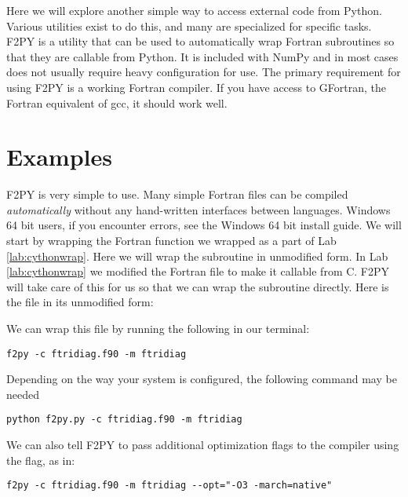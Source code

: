 \label{lab:f2py}

Here we will explore another simple way to access external code from Python.
Various utilities exist to do this, and many are specialized for specific tasks.
F2PY is a utility that can be used to automatically wrap Fortran subroutines so that they are callable from Python.
It is included with NumPy and in most cases does not usually require heavy configuration for use.
The primary requirement for using F2PY is a working Fortran compiler.
If you have access to GFortran, the Fortran equivalent of gcc, it should work well.

\section*{Examples}

F2PY is very simple to use.
Many simple Fortran files can be compiled \emph{automatically} without any hand-written interfaces between languages.
Windows 64 bit users, if you encounter errors, see the Windows 64 bit install guide.
We will start by wrapping the Fortran function we wrapped as a part of Lab \ref{lab:cythonwrap}.
Here we will wrap the subroutine in unmodified form.
In Lab \ref{lab:cythonwrap} we modified the Fortran file to make it callable from C.
F2PY will take care of this for us so that we can wrap the subroutine directly.
Here is the file in its unmodified form:

We can wrap this file by running the following in our terminal:
\begin{lstlisting}[style=ShellInput]
f2py -c ftridiag.f90 -m ftridiag
\end{lstlisting}
Depending on the way your system is configured, the following command may be needed
\begin{lstlisting}[style=ShellInput]
python f2py.py -c ftridiag.f90 -m ftridiag
\end{lstlisting}
We can also tell F2PY to pass additional optimization flags to the compiler using the  flag, as in:
\begin{lstlisting}[style=ShellInput]
f2py -c ftridiag.f90 -m ftridiag --opt="-O3 -march=native"
\end{lstlisting}

